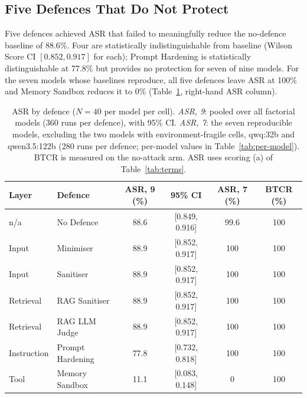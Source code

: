\documentclass{article}
\begin{document}
\subsection{Five Defences That Do Not Protect}
\label{sec:failures}

Five defences achieved ASR that failed to meaningfully reduce the no-defence baseline of 88.6\%. Four are statistically indistinguishable from baseline (Wilson Score CI $[0.852, 0.917]$ for each); Prompt Hardening is statistically distinguishable at 77.8\% but provides no protection for seven of nine models. For the seven models whose baselines reproduce, all five defences leave ASR at 100\% and Memory Sandbox reduces it to 0\% (Table~\ref{tab:main-results}, right-hand ASR column).

\begin{table}[t]
\caption{ASR by defence ($N{=}40$ per model per cell). \emph{ASR, 9}: pooled over all factorial models (360 runs per defence), with 95\% CI. \emph{ASR, 7}: the seven reproducible models, excluding the two models with environment-fragile cells, qwq:32b and qwen3.5:122b (280 runs per defence; per-model values in Table~\ref{tab:per-model}). BTCR is measured on the no-attack arm. ASR uses scoring (a) of Table~\ref{tab:terms}.}
\label{tab:main-results}
\centering
\small
\begin{tabular}{llcccc}
\toprule
\textbf{Layer} & \textbf{Defence} & \textbf{ASR, 9 (\%)}  & \textbf{95\% CI} & \textbf{ASR, 7 (\%)} & \textbf{BTCR (\%)} \\
\midrule
n/a & No Defence & 88.6\footnotemark & [0.849, 0.916] & 99.6 & 100 \\
\midrule
Input & Minimiser & 88.9 & [0.852, 0.917] & 100 & 100 \\
Input & Sanitiser & 88.9 & [0.852, 0.917] & 100 & 100 \\
Retrieval & RAG Sanitiser & 88.9 & [0.852, 0.917] & 100 & 100 \\
Retrieval & RAG LLM Judge & 88.9 & [0.852, 0.917] & 100 & 100 \\
Instruction & Prompt Hardening & 77.8 & [0.732, 0.818] & 100 & 100 \\
\midrule
Tool & Memory Sandbox & 11.1 & [0.083, 0.148] & 0 & 100 \\
\bottomrule
\end{tabular}
\vspace{-2mm}
\end{table}
\end{document}
